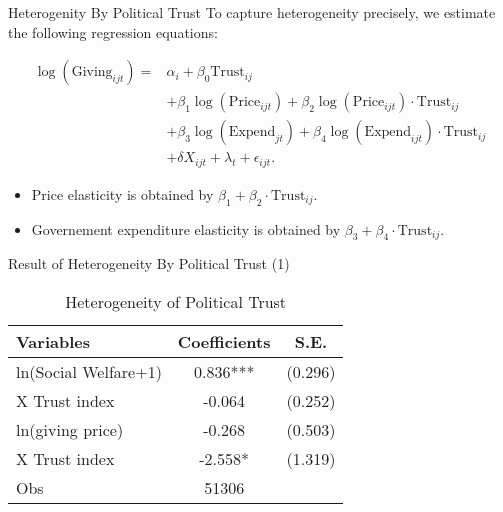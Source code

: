 \documentclass[
  ignorenonframetext,
]{beamer}
\providecommand{\tightlist}{%
  \setlength{\itemsep}{0pt}\setlength{\parskip}{0pt}}
\begin{document}
\begin{frame}{Heterogenity By Political Trust}
\protect\hypertarget{heterogenity-by-political-trust}{}
To capture heterogeneity precisely, we estimate the following regression
equations:

\begin{align*}
    \log(\text{Giving}_{ijt}) = 
    &\alpha_i + \beta_0 \text{Trust}_{ij} \\
    &+ \beta_1 \log(\text{Price}_{ijt}) + \beta_2 \log(\text{Price}_{ijt})\cdot\text{Trust}_{ij} \\
    &+ \beta_3 \log(\text{Expend}_{jt}) + \beta_4 \log(\text{Expend}_{ijt})\cdot\text{Trust}_{ij}\\
    &+ \delta X_{ijt} + \lambda_t + \epsilon_{ijt}.
\end{align*}

\begin{itemize}
\tightlist
\item
  Price elasticity is obtained by
  \(\beta_1 + \beta_2\cdot\text{Trust}_{ij}\).
\item
  Governement expenditure elasticity is obtained by
  \(\beta_3 + \beta_4\cdot\text{Trust}_{ij}\).
\end{itemize}
\end{frame}

\begin{frame}{Result of Heterogeneity By Political Trust (1)}
\protect\hypertarget{result-of-heterogeneity-by-political-trust-1}{}
\begin{table}

\caption{\label{tab:kableTabTrustHeteroReg}Heterogeneity of Political Trust}
\centering
\begin{tabular}[t]{lcc}
\toprule
Variables & Coefficients & S.E.\\
\midrule
ln(Social Welfare+1) & 0.836*** & (0.296)\\
\hspace{1em}X Trust index & -0.064 & (0.252)\\
ln(giving price) & -0.268 & (0.503)\\
\hspace{1em}X Trust index & -2.558* & (1.319)\\
Obs & 51306 & \\
\bottomrule
\end{tabular}
\end{table}
\end{frame}
\end{document}
